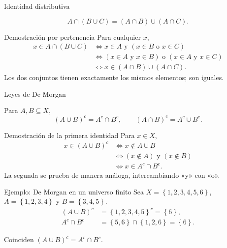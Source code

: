 \documentclass[aspectratio=169,11pt]{beamer}
\newcommand{\Set}[1]{\left\{#1\right\}}
\begin{document}
\begin{frame}{Identidad distributiva}
    \begin{theorem}[Distributividad]
        \[
          A\cap(B\cup C)=(A\cap B)\cup(A\cap C).
        \]
    \end{theorem}
    \begin{block}{Demostración por pertenencia}
        Para cualquier $x$,
        \begin{align*}
          x\in A\cap(B\cup C)
          &\Longleftrightarrow x\in A\text{ y }(x\in B\text{ o }x\in C)\\
          &\Longleftrightarrow (x\in A\text{ y }x\in B)\text{ o }(x\in A\text{ y }x\in C)\\
          &\Longleftrightarrow x\in(A\cap B)\cup(A\cap C).
        \end{align*}
        Los dos conjuntos tienen exactamente los mismos elementos; son iguales.
    \end{block}
\end{frame}

\begin{frame}{Leyes de De Morgan}
    \begin{theorem}
        Para $A,B\subseteq X$,
        \[
          (A\cup B)^c=A^c\cap B^c,\qquad
          (A\cap B)^c=A^c\cup B^c.
        \]
    \end{theorem}
    \begin{block}{Demostración de la primera identidad}
        Para $x\in X$,
        \begin{align*}
          x\in(A\cup B)^c
          &\Longleftrightarrow x\notin A\cup B\\
          &\Longleftrightarrow (x\notin A)\text{ y }(x\notin B)\\
          &\Longleftrightarrow x\in A^c\cap B^c.
        \end{align*}
        La segunda se prueba de manera análoga, intercambiando «y» con «o».
    \end{block}
\end{frame}

\begin{frame}{Ejemplo: De Morgan en un universo finito}
    Sea $X=\Set{1,2,3,4,5,6}$, $A=\Set{1,2,3,4}$ y $B=\Set{3,4,5}$.
    \begin{align*}
        (A\cup B)^c &= \Set{1,2,3,4,5}^c=\Set{6},\\
        A^c\cap B^c &= \Set{5,6}\cap\Set{1,2,6}=\Set{6}.
    \end{align*}
    \begin{exampleblock}{Coinciden}
        $(A\cup B)^c=A^c\cap B^c$.
    \end{exampleblock}
    \centering\small 
\end{frame}
\end{document}
